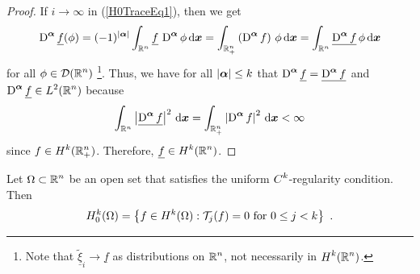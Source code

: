 \begin{proof}
If $i \to \infty$ in (\ref{H0TraceEq1}), then we get
\[
\operatorname{D}^{{\bm{\alpha}}} \underline{f} (\phi)
= (-1)^{|{\bm{\alpha}}|} \int_{\mathbb{R}^n}
\underline{f}\, \operatorname{D}^{{\bm{\alpha}}} \phi \,\mathrm{d}{{\bm{x}}}
= \int_{\mathbb{R}^n_+} \left(\operatorname{D}^{{\bm{\alpha}}} f \right)\, \phi \,\mathrm{d}{{\bm{x}}}
= \int_{\mathbb{R}^n} \underline{\operatorname{D}^{{\bm{\alpha}}} f}\, \phi \,\mathrm{d}{{\bm{x}}}
\]
for all $\displaystyle \phi \in \mathcal{D}(\mathbb{R}^n)$ \footnote{Note that
$\underline{\tilde{\xi}}_i \to \underline{f}$ as distributions on
$\displaystyle \mathbb{R}^n$, not necessarily in $\displaystyle H^k(\mathbb{R}^n)$.}.
Thus, we have for all $|{\bm{\alpha}}| \leq k$
that $\displaystyle \operatorname{D}^{{\bm{\alpha}}} \underline{f}
= \underline{\operatorname{D}^{{\bm{\alpha}}} f}$
and $\displaystyle \operatorname{D}^{{\bm{\alpha}}} \underline{f} \in L^2(\mathbb{R}^n)$ because
\[
\int_{\mathbb{R}^n} \left|\underline{\operatorname{D}^{{\bm{\alpha}}} f}\right|^2 \,\mathrm{d}{{\bm{x}}}
= \int_{\mathbb{R}^n_+} \left|\operatorname{D}^{{\bm{\alpha}}} f\right|^2 \,\mathrm{d}{{\bm{x}}} < \infty
\]
since $\displaystyle f \in H^k(\mathbb{R}^n_+)$.
Therefore, $\displaystyle \underline{f} \in H^k(\mathbb{R}^n)$.
\end{proof}

\begin{theorem} \label{H0TraceOmega}
Let $\displaystyle \Omega \subset \mathbb{R}^n$ be an open set that satisfies
the uniform $\displaystyle C^k$-regularity condition.  Then
\[
H^{k}_0(\Omega) = \left\{ f \in H^{k}(\Omega) : \mathcal{T}_j(f) = 0
\ \text{for} \ 0 \leq j < k \right\} \ .
\]
\end{theorem}

